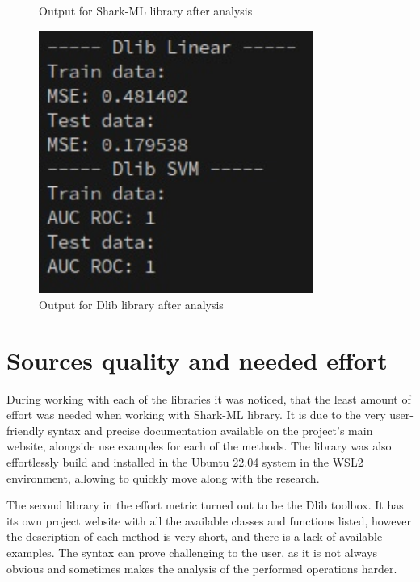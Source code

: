 \begin{figure}[!ht]
\begin{minipage}{0.31\textwidth}
		\caption{Output for Shark-ML library after analysis}
		\label{fig:shark_linear_svm2}		
	\end{minipage}%
	\hspace{0.02\textwidth}
	\begin{minipage}{0.31\textwidth}
		\centering
		\includegraphics[width=0.8\textwidth]{Rysunki/Rozdzial7/dlib_linear_svm}
		\caption{Output for Dlib library after analysis}
		\label{fig:dlib_linear_svm2}
	\end{minipage}
\end{figure} 

\section{Sources quality and needed effort}

During working with each of the libraries it was noticed, that the least amount of effort was needed when working with Shark-ML library. It is due to the very user-friendly syntax and precise documentation available on the project's main website, alongside use examples for each of the methods. The library was also effortlessly build and installed in the Ubuntu 22.04 system in the WSL2 environment, allowing to quickly move along with the research.

The second library in the effort metric turned out to be the Dlib toolbox. It has its own project website with all the available classes and functions listed, however the description of each method is very short, and there is a lack of available examples. The syntax can prove challenging to the user, as it is not always obvious and sometimes makes the analysis of the performed operations harder.

